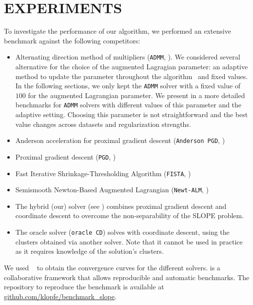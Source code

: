 \section{EXPERIMENTS}\label{sec:experiments}

To investigate the performance of our algorithm, we performed an extensive benchmark against the following competitors:
\begin{itemize}[noitemsep]
  \item Alternating direction method of multipliers (\texttt{ADMM}, \cite{boyd2010}).
        We considered several alternative for the choice of the augmented Lagragian parameter: an adaptive method to update the parameter throughout the algorithm~\parencite[Sec. 3.4.1]{boyd2010} and fixed values.
        In the following sections, we only kept the \texttt{ADMM} solver with a fixed value of $100$ for the augmented Lagrangian parameter.
        We present in  a more detailed benchmarks for \texttt{ADMM} solvers with different values of this parameter and the adaptive setting.
        Choosing this parameter is not straightforward and the best value changes across datasets and regularization strengths.
  \item Anderson acceleration for proximal gradient descent (\texttt{Anderson PGD}, \cite{zhang2020})
  \item Proximal gradient descent (\texttt{PGD}, \cite{combettes2005})
  \item Fast Iterative Shrinkage-Thresholding Algorithm (\texttt{FISTA}, \cite{beck2009})
  \item Semismooth Newton-Based Augmented Lagrangian (\texttt{Newt-ALM}, \cite{Ziyan2019})

  \item The hybrid (our) solver (see ) combines proximal gradient descent
        and coordinate descent to overcome the non-separability of the SLOPE problem.
  \item The oracle solver (\texttt{oracle CD}) solves  with coordinate descent, using the clusters obtained via another solver.
        Note that it cannot be used in practice as it requires knowledge of the solution's clusters.
\end{itemize}

We used ~\parencite{moreau2022benchopt} to obtain the convergence curves for the different solvers.
 is a collaborative framework that allows reproducible and automatic benchmarks.
The repository to reproduce the benchmark is available at \href{https://github.com/klopfe/benchmark\_slope}{\url{github.com/klopfe/benchmark\_slope}}.

